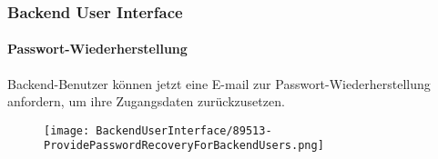 
\begin{frame}[fragile]
	\frametitle{Backend User Interface}
	\framesubtitle{Passwort-Wiederherstellung}

	Backend-Benutzer können jetzt eine E-mail zur Passwort-Wiederherstellung anfordern, um ihre Zugangsdaten zurückzusetzen.

	\begin{figure}
		\texttt{[image: BackendUserInterface/89513-ProvidePasswordRecoveryForBackendUsers.png]}
	\end{figure}

\end{frame}

